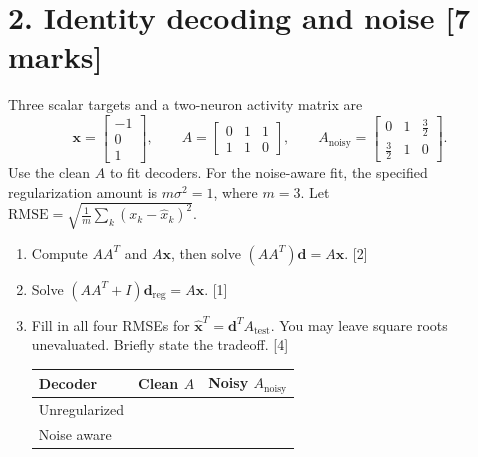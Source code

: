 \documentclass[10pt,letterpaper]{article}
\newcommand{\vct}[1]{\boldsymbol{#1}}
\begin{document}
\section*{2. Identity decoding and noise \hfill [7 marks]}
Three scalar targets and a two-neuron activity matrix are
\[
\vct{x}=\begin{bmatrix}-1\\0\\1\end{bmatrix},\qquad
A=\begin{bmatrix}0&1&1\\1&1&0\end{bmatrix},\qquad
A_{\mathrm{noisy}}=\begin{bmatrix}0&1&\tfrac32\\\tfrac32&1&0\end{bmatrix}.
\]
Use the clean \(A\) to fit decoders. For the noise-aware fit, the specified regularization amount is \(m\sigma^2=1\), where \(m=3\). Let \(\mathrm{RMSE}=\sqrt{\frac1m\sum_k(x_k-\hat x_k)^2}\).
\begin{enumerate}[label=\textbf{(\alph*)}]
\item Compute \(AA^T\) and \(A\vct{x}\), then solve \((AA^T)\vct{d}=A\vct{x}\). [2]
\item Solve \((AA^T+I)\vct{d}_{\mathrm{reg}}=A\vct{x}\). [1]
\item Fill in all four RMSEs for \(\hat{\vct{x}}^T=\vct{d}^T A_{\mathrm{test}}\). You may leave square roots unevaluated. Briefly state the tradeoff. [4]
\begin{center}\begin{tabular}{lcc}\toprule Decoder & Clean \(A\) & Noisy \(A_{\mathrm{noisy}}\)\\\midrule
Unregularized & & \\
Noise aware & & \\
\bottomrule\end{tabular}\end{center}
\end{enumerate}
\end{document}
